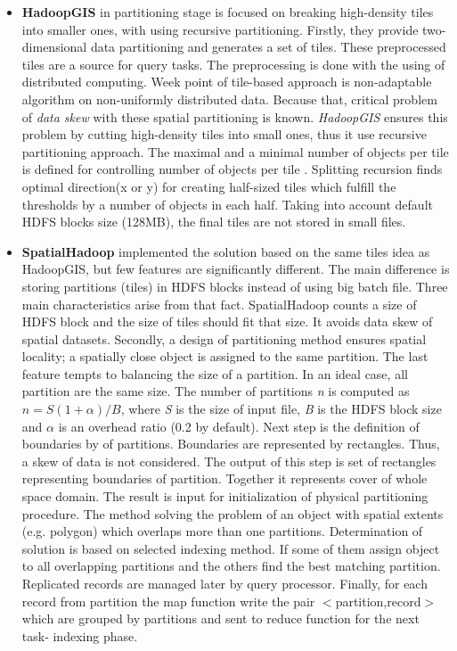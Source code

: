 \documentclass[a4paper,12pt,oneside]{report}
\begin{document}
	\begin{itemize}
		\item \textbf{HadoopGIS} in partitioning stage is focused on breaking
		high-density tiles into smaller ones, with using 
		recursive partitioning. Firstly, they provide two-dimensional data partitioning
		and generates a set of tiles.
		These preprocessed tiles are a source for query tasks. The preprocessing is done
		with the using of distributed computing.
		Week point of tile-based approach is non-adaptable algorithm on non-uniformly
		distributed data. Because that, 
		critical problem of \textit{data skew} with these spatial partitioning is
		known. \textit{HadoopGIS} ensures 
		this problem by cutting high-density tiles into small ones, thus it use
		recursive partitioning approach. The maximal and a minimal number of objects per
		tile is defined for controlling 
		number of objects per tile . Splitting recursion 
		finds optimal direction(x or y) for creating half-sized tiles which fulfill the
		thresholds by a number of objects 
		in each half.  Taking into account default HDFS blocks size (128MB), the final
		tiles are not stored in small files.
		
		\item  \textbf{SpatialHadoop} implemented the solution  based on the same tiles
		idea as HadoopGIS, but few features 
		are significantly different.
		The main difference is storing partitions (tiles) in HDFS blocks  instead of
		using big batch file. Three main characteristics arise from that fact.
		SpatialHadoop counts 
		a size of HDFS block and the size of tiles should fit that size. It avoids data
		skew of spatial datasets. 
		Secondly, a design of partitioning method ensures spatial locality; a spatially
		close object is assigned to the same 
		partition. The last feature tempts to balancing the size of a partition. In an
		ideal case, all partition are the 
		same size. The number of partitions \emph{n} is computed as $n=S(1+ \alpha)/B$,
		where \emph{S} is the size of input file, \emph{B} is the HDFS block size and
		$\alpha$ is an overhead ratio (0.2 by default). 
		Next step is the definition of boundaries by of partitions. Boundaries are
		represented by rectangles. Thus, a skew of data is not considered. 
		The output of this step is set of rectangles representing  boundaries of
		partition. Together it represents cover 
		of whole space domain. The result is input for initialization of physical
		partitioning procedure. The method solving 
		the problem of an object with spatial extents (e.g. polygon) which overlaps more
		than one partitions. Determination 
		of solution is based on selected indexing method. If some of them assign object
		to all overlapping partitions and 
		the others find the best matching partition. Replicated records are managed
		later by  query processor. Finally, 
		for each record from partition the map function write the pair
		$<$partition,record$>$ which are grouped by 
		partitions and sent to reduce function for the next task- indexing phase.
	\end{itemize}
	
\end{document}

